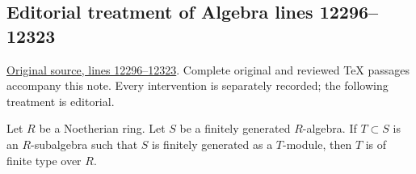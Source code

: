 \subsection{Editorial treatment of Algebra lines 12296--12323}

\hypertarget{algebra-context-164}{}

\noindent\href{https://github.com/stacks/stacks-project/blob/a04446e57ec1fbc252a871afcec7752fb2807b14/algebra.tex\#L12296}{Original source, lines 12296--12323}. Complete original and reviewed TeX passages accompany this note. Every intervention is separately recorded; the following treatment is editorial.


\begin{lemma}
\label{editorial-source-lemma-Artin-Tate}
Let $R$ be a Noetherian ring. Let $S$ be a finitely
generated $R$-algebra. If $T \subset S$ is an $R$-subalgebra such
that $S$ is finitely generated as a $T$-module, then $T$ is of
finite type over $R$.
\end{lemma}

